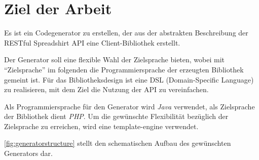 \section{Ziel der Arbeit}

Es ist ein Codegenerator zu erstellen, der aus der abstrakten Beschreibung der \gls{RESTful} Spreadshirt \gls{API} eine Client-Bibliothek erstellt. 

Der Generator soll eine flexible Wahl der Zielsprache bieten, wobei mit \enquote{Zielsprache} im folgenden die Programmiersprache der erzeugten Bibliothek gemeint ist. 
Für das Bibliotheksdesign ist eine \gls{DSL} (Domain-Specific Language) zu realisieren, mit dem Ziel die Nutzung der \gls{API} zu vereinfachen. 

Als Programmiersprache für den Generator wird \emph{Java} verwendet, als Zielsprache der Bibliothek dient \emph{PHP}. Um die gewünschte Flexibilität bezüglich der Zielsprache zu erreichen, wird eine \gls{template-engine} verwendet.

\cref{fig:generatorstructure} stellt den schematischen Aufbau des gewünschten Generators dar.

